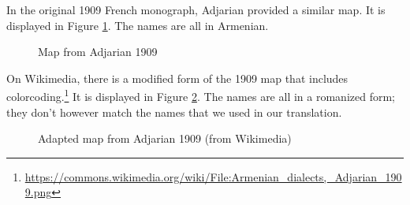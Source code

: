 In the original 1909 French monograph, Adjarian provided a similar map. It   is displayed in Figure \ref{map:Adjarian1909}. The names are all in Armenian. 

\begin{figure}[H]
	\caption{Map from Adjarian 1909}
	\label{map:Adjarian1909}
\end{figure}

On Wikimedia, there is a modified form of the 1909 map that includes colorcoding.\footnote{\url{https://commons.wikimedia.org/wiki/File:Armenian_dialects,_Adjarian_1909.png}} It   is displayed in Figure \ref{map:Adjarian1909color}. The names are all in a romanized form; they don't however match the names that we used in our translation. 



\begin{figure}[H]
	\caption{Adapted map from Adjarian 1909 (from Wikimedia)}
	\label{map:Adjarian1909color}
\end{figure}

